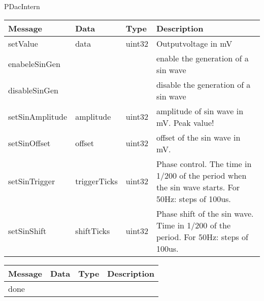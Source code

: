  {PDacIntern}

\begin{tabular}[ht]{|l|l|l|p{8cm}|}
\hline
Message & Data & Type & Description\\
\hline
setValue &  data  &  uint32  & %
Outputvoltage in mV
\\
\hline
enabeleSinGen &  &  & %
enable the generation of a sin wave
\\
\hline
disableSinGen &  &  & %
disable the generation of a sin wave
\\
\hline
setSinAmplitude &  amplitude  &  uint32  & %
amplitude of sin wave in mV. Peak value!
\\
\hline
setSinOffset &  offset  &  uint32  & %
offset of the sin wave in mV.
\\
\hline
setSinTrigger &  triggerTicks  &  uint32  & %
Phase control. The time in 1/200 of the period when the sin wave starts. For 50Hz: steps of 100us.
\\
\hline
setSinShift &  shiftTicks  &  uint32  & %
Phase shift of the sin wave. Time in 1/200 of the period. For 50Hz: steps of 100us.
\\
\hline
\end{tabular}
\begin{tabular}[ht]{|l|l|l|p{8cm}|}
\hline
Message & Data & Type & Description\\
\hline
done &  &  & \\
\hline
\end{tabular}
